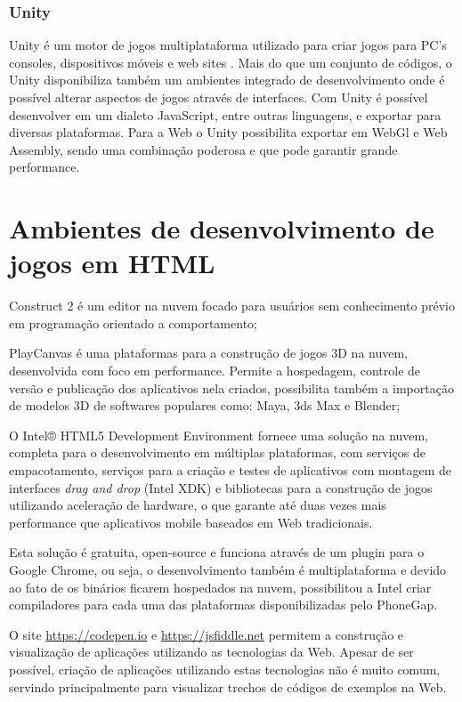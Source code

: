 \subsection{Unity}

Unity é um motor de jogos multiplataforma utilizado para criar jogos
para PC's consoles, dispositivos móveis e web sites \autocite{unity}.
Mais do que um conjunto de códigos, o Unity disponibiliza também
um ambientes integrado de desenvolvimento onde é possível alterar
aspectos de jogos através de interfaces. Com Unity é possível
desenvolver em um dialeto JavaScript, entre outras linguagens, e
exportar para diversas plataformas. Para a Web o Unity possibilita
exportar em WebGl e Web Assembly, sendo uma combinação poderosa e que
pode garantir grande performance.


\chapter{Ambientes de desenvolvimento de jogos em HTML}

Construct 2 é um editor na nuvem focado para usuários sem
conhecimento prévio em programação orientado a comportamento;

PlayCanvas é uma plataformas para a construção de jogos 3D
na nuvem, desenvolvida com foco em performance. Permite a hospedagem,
controle de versão e publicação dos aplicativos nela criados,
possibilita também a importação de modelos 3D de softwares populares
como: Maya, 3ds Max e Blender;

O Intel® HTML5 Development Environment fornece uma solução na nuvem,
completa para o desenvolvimento em múltiplas plataformas, com serviços de
empacotamento, serviços para a criação e testes de aplicativos com
montagem de interfaces \textit{drag and drop} (Intel XDK) e bibliotecas
para a construção de jogos utilizando aceleração de hardware, o que
garante até duas vezes mais performance que aplicativos mobile baseados
em Web tradicionais.

Esta solução é gratuita, open-source e funciona através de um
plugin para o Google Chrome, ou seja, o desenvolvimento também é
multiplataforma e devido ao fato de os binários ficarem hospedados
na nuvem, possibilitou a Intel criar compiladores para cada uma das
plataformas disponibilizadas pelo PhoneGap.

O site \url{https://codepen.io} e \url{https://jsfiddle.net} permitem a
construção e visualização de aplicações utilizando as tecnologias
da Web. Apesar de ser possível, criação de aplicações utilizando
estas tecnologias não é muito comum, servindo principalmente para
visualizar trechos de códigos de exemplos na Web.

